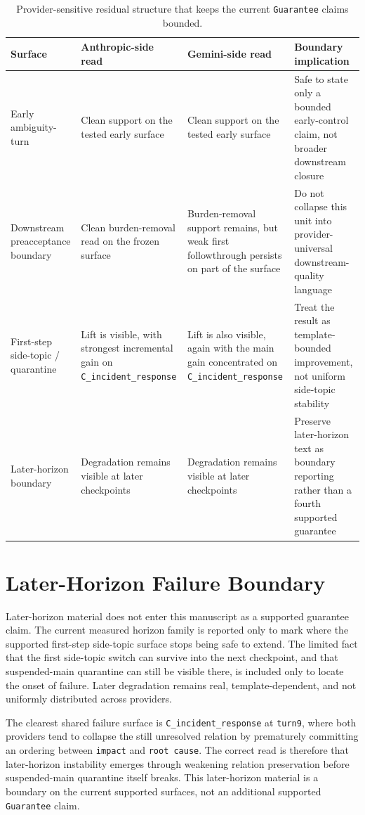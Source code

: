 \documentclass[11pt]{article}
\begin{document}
\begin{table}[ht]
\centering
\begin{tabular}{|p{}|p{}|p{}|p{}|}
\hline
\textbf{Surface} & \textbf{Anthropic-side read} & \textbf{Gemini-side read} & \textbf{Boundary implication} \\
\hline
Early ambiguity-turn & Clean support on the tested early surface & Clean support on the tested early surface & Safe to state only a bounded early-control claim, not broader downstream closure \\
\hline
Downstream preacceptance boundary & Clean burden-removal read on the frozen surface & Burden-removal support remains, but weak first followthrough persists on part of the surface & Do not collapse this unit into provider-universal downstream-quality language \\
\hline
First-step side-topic / quarantine & Lift is visible, with strongest incremental gain on \texttt{C\_incident\_response} & Lift is also visible, again with the main gain concentrated on \texttt{C\_incident\_response} & Treat the result as template-bounded improvement, not uniform side-topic stability \\
\hline
Later-horizon boundary & Degradation remains visible at later checkpoints & Degradation remains visible at later checkpoints & Preserve later-horizon text as boundary reporting rather than a fourth supported guarantee \\
\hline
\end{tabular}
\caption{Provider-sensitive residual structure that keeps the current
\texttt{Guarantee} claims bounded.}
\end{table}

\section{Later-Horizon Failure Boundary}

Later-horizon material does not enter this manuscript as a supported guarantee
claim. The current measured horizon family is reported only to mark where the
supported first-step side-topic surface stops being safe to extend. The limited
fact that the first side-topic switch can survive into the next checkpoint, and
that suspended-main quarantine can still be visible there, is included only to
locate the onset of failure. Later degradation remains real, template-dependent,
and not uniformly distributed across providers.

The clearest shared failure surface is \texttt{C\_incident\_response} at
\texttt{turn9}, where both providers tend to collapse the still unresolved
relation by prematurely committing an ordering between \texttt{impact} and
\texttt{root cause}. The correct read is therefore that later-horizon
instability emerges through weakening relation preservation before
suspended-main quarantine itself breaks. This later-horizon material is a
boundary on the current supported surfaces, not an additional supported
\texttt{Guarantee} claim.
\end{document}
